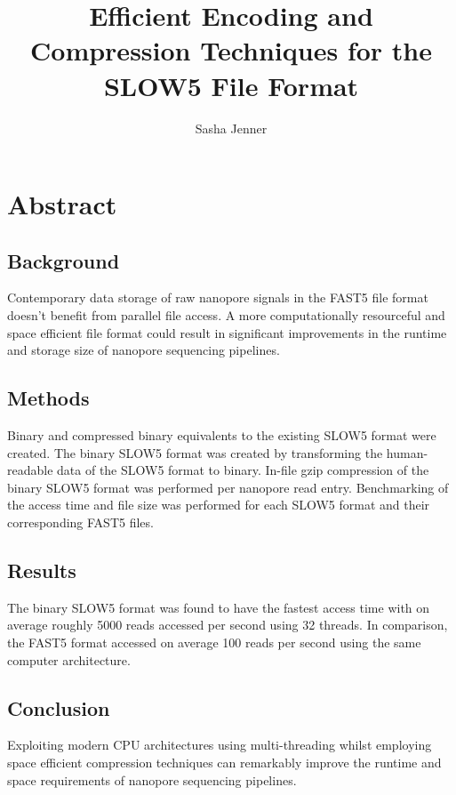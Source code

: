 \documentclass[a4paper, 12pt]{article}
\begin{document}
\title{Efficient Encoding and Compression Techniques for the SLOW5 File Format}
\author{Sasha Jenner}

\maketitle
\tableofcontents
\listoffigures

\section{Abstract}

\subsection{Background}

Contemporary data storage of raw nanopore signals in the FAST5 file format doesn't benefit from parallel file access. A more computationally resourceful and space efficient file format could result in significant improvements in the runtime and storage size of nanopore sequencing pipelines.

\subsection{Methods}

Binary and compressed binary equivalents to the existing SLOW5 format were created. The binary SLOW5 format was created by transforming the human-readable data of the SLOW5 format to binary. In-file gzip compression of the binary SLOW5 format was performed per nanopore read entry. Benchmarking of the access time and file size was performed for each SLOW5 format and their corresponding FAST5 files.

\subsection{Results}

The binary SLOW5 format was found to have the fastest access time with on average roughly 5000 reads accessed per second using 32 threads. In comparison, the FAST5 format accessed on average 100 reads per second using the same computer architecture.

\subsection{Conclusion}

Exploiting modern CPU architectures using multi-threading whilst employing space efficient compression techniques can remarkably improve the runtime and space requirements of nanopore sequencing pipelines.
\end{document}
